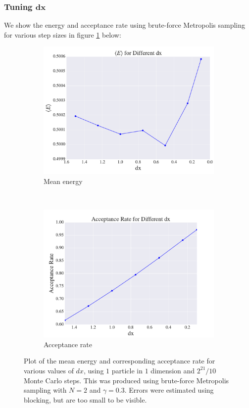 \documentclass[a4paper, 10pt]{article}
\begin{document}
\subsubsection{Tuning $\boldsymbol{dx}$}
 We show the energy and acceptance rate using brute-force Metropolis sampling for various step sizes in figure \ref{fig:results_benchmark_no_importance} below:\\
\begin{figure}[h!]
\centering
\begin{subfigure}[hb!]{0.7\textwidth}
	\centering
	\includegraphics[width=\textwidth]{../Results/E_v_dx_normal.pdf}
	\caption{Mean energy}
\end{subfigure}
~
\begin{subfigure}[hb!]{0.7\textwidth}
	 	\centering
	 	\includegraphics[width=\textwidth]{../Results/AC_normal.pdf}
	 	\caption{Acceptance rate}
\end{subfigure}
\caption{Plot of the mean energy and corresponding acceptance rate for various values of $dx$, using $1$ particle in $1$ dimension and $2^{21}/10$ Monte Carlo steps. This was produced using brute-force Metropolis sampling with $N=2$ and $\gamma=0.3$. Errors were estimated using blocking, but are too small to be visible.}\label{fig:results_benchmark_no_importance}
\end{figure}
\end{document}
